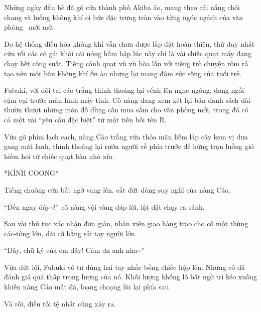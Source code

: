 \documentclass[../main.tex]{subfiles}
\begin{document}

Những ngày đầu hè đã gõ cửa thành phố Akiba ảo, mang theo cái nắng chói chang và luồng không khí oi bức đặc trưng tràn vào từng ngóc ngách của văn phòng \hll\ mới mở.

Do hệ thống điều hòa không khí vẫn chưa được lắp đặt hoàn thiện, thứ duy nhất cứu rỗi các cô gái khỏi cái nóng hầm hập lúc này chỉ là vài chiếc quạt máy đang chạy hết công suất. Tiếng cánh quạt vù vù hòa lẫn với tiếng trò chuyện rôm rả tạo nên một bầu không khí ồn ào nhưng lại mang đậm sức sống của tuổi trẻ.

Fubuki, với đôi tai cáo trắng thỉnh thoảng lại vểnh lên nghe ngóng, đang ngồi cặm cụi trước màn hình máy tính. Cô nàng đang xem xét lại bản danh sách dài thườn thượt những món đồ dùng cần mua sắm cho văn phòng mới, trong đó có cả một vài ``yêu cầu đặc biệt'' từ một tiền bối tên R.

Vừa gõ phím lạch cạch, nàng Cáo trắng vừa thỏa mãn liếm láp cây kem vị dưa gang mát lạnh, thỉnh thoảng lại rướn người về phía trước để hứng trọn luồng gió hiếm hoi từ chiếc quạt bàn nhỏ xíu.

*KÍNH COONG*

Tiếng chuông cửa bất ngờ vang lên, cắt đứt dòng suy nghĩ của nàng Cáo.

``Đến ngay đây\~{}!'' cô nàng vội vàng đáp lời, lật đật chạy ra sảnh.

Sau vài thủ tục xác nhận đơn giản, nhân viên giao hàng trao cho cô một thùng các-tông lớn, dài cỡ bằng sải tay người lớn.

``Đây, chữ ký của em đây! Cảm ơn anh nha\~{}''

Vừa dứt lời, Fubuki vô tư dùng hai tay nhấc bổng chiếc hộp lên. Nhưng cô đã đánh giá quá thấp trọng lượng của nó. Khối lượng khổng lồ bất ngờ trì kéo xuống khiến nàng Cáo mất đà, loạng choạng lùi lại phía sau.

Và rồi, điều tồi tệ nhất cũng xảy ra.
\end{document}
